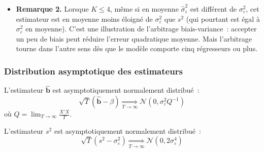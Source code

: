 \documentclass[10pt]{beamer}
\begin{document}
\begin{notes}
\begin{itemize}
    \medskip

    On peut aller plus loin. Considérons la famille d'estimateurs $\nicefrac{SSE}{c}$, indexée par $c>0$, qui contient $s^2$ ($c=T-K$) et l'estimateur du maximum de vraisemblance ($c=T$). Puisque $\nicefrac{SSE}{\sigma_{\varepsilon}^2}\sim\chi^2(n)$ avec $n=T-K$, on a $\mathbb E[SSE]=n\sigma_{\varepsilon}^2$ et $\mathbb V[SSE]=2n\sigma_{\varepsilon}^4$, d'où~:
    \[
      MSE\left( \frac{SSE}{c} \right) = \sigma_{\varepsilon}^4\,\frac{2n + (n-c)^2}{c^2}
    \]
    En annulant la dérivée par rapport à $c$, on vérifie que cette quantité est minimale en $c = n+2$. \textbf{Ni $s^2$ ni l'estimateur du maximum de vraisemblance ne minimisent l'erreur quadratique moyenne}~: c'est $\nicefrac{SSE}{(T-K+2)}$ qui le fait. On retrouve alors la condition ci-dessus~: $c=T$ bat $c=n$ lorsque $T$ est plus proche de $n+2$ que ne l'est $n$, c'est-à-dire lorsque $K\leq 4$.\newline

  \item \textbf{Remarque 2.} Lorsque $K\leq 4$, même si en moyenne $\hat{\sigma}_{\varepsilon}^2$ est différent de $\sigma_{\varepsilon}^2$, cet estimateur est en moyenne moins éloigné de  $\sigma_{\varepsilon}^2$ que $s^2$ (qui pourtant est égal à  $\sigma_{\varepsilon}^2$ en moyenne). C'est une illustration de l'arbitrage biais-variance~: accepter un peu de biais peut réduire l'erreur quadratique moyenne. Mais l'arbitrage tourne dans l'autre sens dès que le modèle comporte cinq régresseurs ou plus.

  \end{itemize}

\end{notes}


\begin{frame}
  \frametitle{Distribution asymptotique des estimateurs}

  \begin{prop}\label{prop:asymptotic_dist:bhat}
    L'estimateur $\hat{\mathbf b}$ est asymptotiquement normalement distribué~:
    \[
      \sqrt{T}\left( \hat{\mathbf b} - \beta\right) \underset{T\to\infty}{\Longrightarrow} \mathcal N\left( 0, \sigma_{\varepsilon}^2 Q^{-1}\right)
    \]
    où $Q = \lim_{T\to\infty}\frac{X'X}{T}$.
  \end{prop}

  \bigskip

  \begin{prop}\label{prop:asymptotic_dist:s2}
    L'estimateur $s^2$ est asymptotiquement normalement distribué~:
    \[
      \sqrt{T}\left( s^2 - \sigma_{\varepsilon}^2\right) \underset{T\to\infty}{\Longrightarrow} \mathcal N\left( 0, 2\sigma_{\varepsilon}^4\right)
    \]
  \end{prop}

\end{frame}
\end{document}
